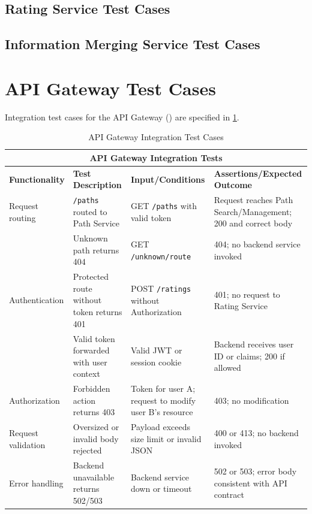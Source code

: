 \subsection{Rating Service Test Cases}
\label{subsec:rating_service_test_cases}%


\subsection{Information Merging Service Test Cases}
\label{subsec:information_merging_service_test_cases}%


\section{API Gateway Test Cases}
\label{sec:api_gateway_test_cases}%

Integration test cases for the API Gateway () are specified in \cref{tab:test_cases_api_gateway}.

\begin{table}[ht]
\centering
\begin{tabular}{|p{3.2cm}|p{3.8cm}|p{3.2cm}|p{4.8cm}|}
\hline
\multicolumn{4}{|c|}{\textbf{API Gateway Integration Tests}} \\ 
\hline
\textbf{Functionality} & \textbf{Test Description} & \textbf{Input/Conditions} & \textbf{Assertions/Expected Outcome} \\
\hline
Request routing
 & \texttt{/paths} routed to Path Service
 & GET \texttt{/paths} with valid token
 & Request reaches Path Search/Management; 200 and correct body \\ \hline
 & Unknown path returns 404
 & GET \texttt{/unknown/route}
 & 404; no backend service invoked \\ \hline
Authentication
 & Protected route without token returns 401
 & POST \texttt{/ratings} without Authorization
 & 401; no request to Rating Service \\ \hline
 & Valid token forwarded with user context
 & Valid JWT or session cookie
 & Backend receives user ID or claims; 200 if allowed \\ \hline
Authorization
 & Forbidden action returns 403
 & Token for user A; request to modify user B's resource
 & 403; no modification \\ \hline
Request validation
 & Oversized or invalid body rejected
 & Payload exceeds size limit or invalid JSON
 & 400 or 413; no backend invoked \\ \hline
Error handling
 & Backend unavailable returns 502/503
 & Backend service down or timeout
 & 502 or 503; error body consistent with API contract \\ \hline
\end{tabular}
\caption{API Gateway Integration Test Cases}
\label{tab:test_cases_api_gateway}
\end{table}

